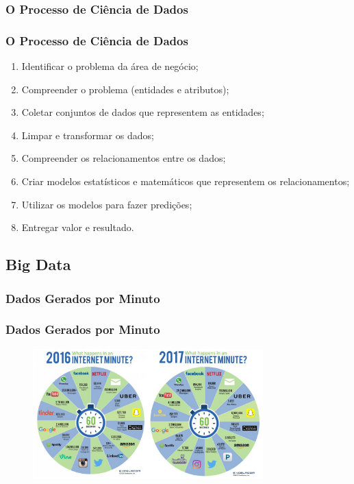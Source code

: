 \documentclass[10pt,xcolor=table]{beamer}
\begin{document}
\subsubsection{O Processo de Ciência de Dados}
\begin{frame}\frametitle{O Processo de Ciência de Dados} 
  \begin{enumerate}
    \item Identificar o problema da área de negócio;
    \item Compreender o problema (entidades e atributos);
    \item Coletar conjuntos de dados que representem as entidades;
    \item Limpar e transformar os dados;
    \item Compreender os relacionamentos entre os dados;
    \item Criar modelos estatísticos e matemáticos que representem os relacionamentos;
    \item Utilizar os modelos para fazer predições;
    \item Entregar valor e resultado.
  \end{enumerate}
\end{frame}

\subsection{Big Data}
\subsubsection{Dados Gerados por Minuto}
\begin{frame}\frametitle{Dados Gerados por Minuto} 
  \begin{figure}[hb]
    \includegraphics[width=3.5in]{Figure/dataGeneratorByMinuteExcelacom.jpg}
  \end{figure}
\end{frame}
\end{document}
